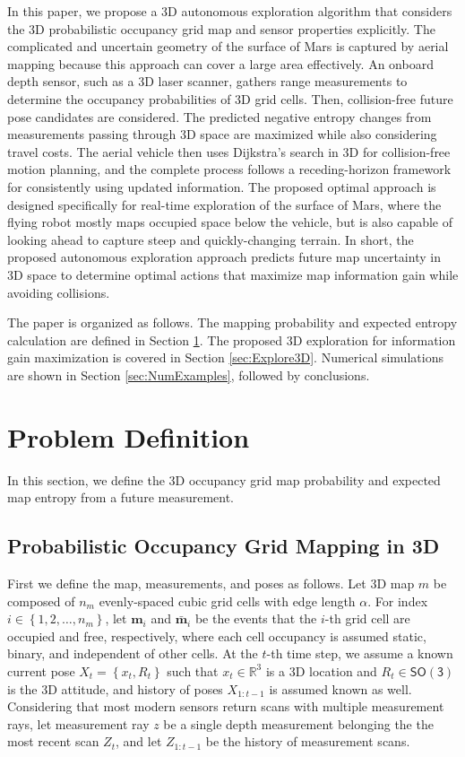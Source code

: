 \documentclass[conf]{new-aiaa}
\newcommand{\braces}[1]{\ensuremath{\left\{ #1 \right\}}}
\newcommand{\SO}{\ensuremath{\mathsf{SO(3)}}}
\renewcommand{\Re}{\ensuremath{\mathbb{R}}}
\begin{document}
In this paper, we propose a 3D autonomous exploration algorithm that considers the 3D probabilistic occupancy grid map and sensor properties explicitly. The complicated and uncertain geometry of the surface of Mars is captured by aerial mapping because this approach can cover a large area effectively. An onboard depth sensor, such as a 3D laser scanner, gathers range measurements to determine the occupancy probabilities of 3D grid cells. Then, collision-free future pose candidates are considered. The predicted negative entropy changes from measurements passing through 3D space are maximized while also considering travel costs. The aerial vehicle then uses Dijkstra's search in 3D for collision-free motion planning, and the complete process follows a receding-horizon framework for consistently using updated information. The proposed optimal approach is designed specifically for real-time exploration of the surface of Mars, where the flying robot mostly maps occupied space below the vehicle, but is also capable of looking ahead to capture steep and quickly-changing terrain. In short, the proposed autonomous exploration approach predicts future map uncertainty in 3D space to determine optimal actions that maximize map information gain while avoiding collisions.

The paper is organized as follows. The mapping probability and expected entropy calculation are defined in Section \ref{sec:ProbDef}. The proposed 3D exploration for information gain maximization is covered in Section \ref{sec:Explore3D}. Numerical simulations are shown in Section \ref{sec:NumExamples}, followed by conclusions.

\section{Problem Definition}
\label{sec:ProbDef}

In this section, we define the 3D occupancy grid map probability and expected map entropy from a future measurement.

\subsection{Probabilistic Occupancy Grid Mapping in 3D}

First we define the map, measurements, and poses as follows. Let 3D map $ m$ be composed of $n_m$ evenly-spaced cubic grid cells with edge length $\alpha$. For index $i\in\braces{1,2,\ldots,n_m}$, let $\mathbf{m}_i$ and $\bar{\mathbf{m}}_i$ be the events that the $i$-th grid cell are occupied and free, respectively, where each cell occupancy is assumed static, binary, and independent of other cells. At the $t$-th time step, we assume a known current pose $X_t=\braces{x_t,R_t}$ such that $x_t\in\Re^3$ is a 3D location and $R_t\in\SO$ is the 3D attitude, and history of poses $X_{1:t-1}$ is assumed known as well. Considering that most modern sensors return scans with multiple measurement rays, let measurement ray $z$ be a single depth measurement belonging the the most recent scan $Z_t$, and let $Z_{1:t-1}$ be the history of measurement scans.
\end{document}
